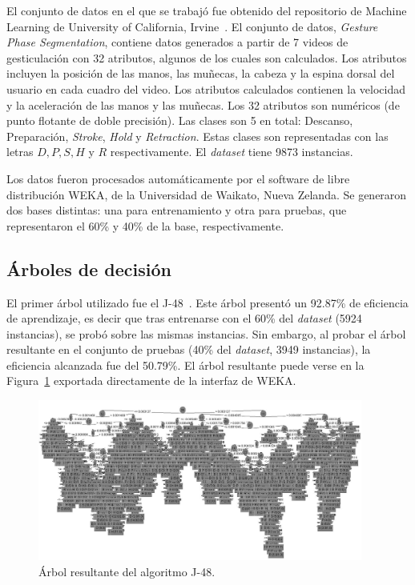 \documentclass{llncs}
\begin{document}
El conjunto de datos en el que se trabajó fue obtenido del repositorio de Machine Learning de University of California, Irvine~\cite{Lichman2013,Madeo2013}.
El conjunto de datos, \textit{Gesture Phase Segmentation},
contiene datos generados a partir de 7 videos de gesticulación con 32 atributos,
algunos de los cuales son calculados.
Los atributos incluyen la posición de las manos, las muñecas, la cabeza y la espina dorsal del usuario en cada cuadro del video.
Los atributos calculados contienen la velocidad y la aceleración de las manos y las muñecas.
Los 32 atributos son numéricos (de punto flotante de doble precisión).
Las clases son 5 en total: Descanso, Preparación, \textit{Stroke}, \textit{Hold} y \textit{Retraction}.
Estas clases son representadas con las letras $D, P, S, H$ y $R$ respectivamente.
El \textit{dataset} tiene 9873 instancias.

Los datos fueron procesados automáticamente por el software de libre distribución WEKA, de la Universidad de Waikato, Nueva Zelanda.
Se generaron dos bases distintas: una para entrenamiento y otra para pruebas, que representaron el 60\% y 40\% de la base, respectivamente.

\subsection{Árboles de decisión}
\label{subsec:trees}

El primer árbol utilizado fue el J-48~\cite{Quinlan1993}.
Este árbol presentó un 92.87\% de eficiencia de aprendizaje,
es decir que tras entrenarse con el 60\% del \textit{dataset} (5924 instancias),
se probó sobre las mismas instancias.
Sin embargo, al probar el árbol resultante en el conjunto de pruebas
(40\% del \textit{dataset}, 3949 instancias),
la eficiencia alcanzada fue del 50.79\%.
El árbol resultante puede verse en la Figura~\ref{fig:j48} exportada directamente de la interfaz de WEKA.

\begin{figure}[htbp]
	\centering
	\includegraphics[width=0.95\textwidth]{05-j48}
	\caption{Árbol resultante del algoritmo J-48.}
	\label{fig:j48}
\end{figure}
\end{document}
